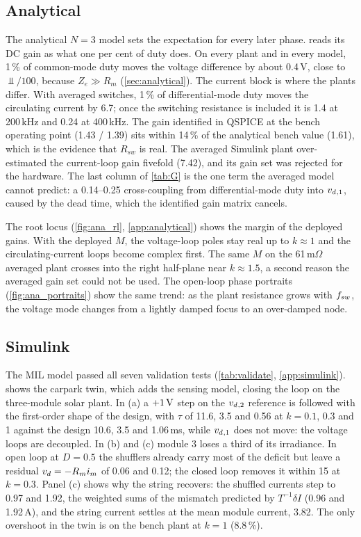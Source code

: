 \subsection{Analytical}
\label{sec:res_analytical}
The analytical $N=3$ model sets the expectation for every later phase.  reads its DC gain as what one per cent of duty does. On every plant and in every model, 1\,\% of common-mode duty moves the voltage difference by about 0.4\,V, close to $\Vbar/100$, because $Z_e \gg R_m$ (\cref{sec:analytical}). The current block is where the plants differ. With averaged switches, 1\,\% of differential-mode duty moves the circulating current by 6.7\A; once the switching resistance is included it is 1.4\A{} at 200\,kHz and 0.24\A{} at 400\,kHz. The gain identified in QSPICE at the bench operating point (1.43 / 1.39\A) sits within 14\,\% of the analytical bench value (1.61\A), which is the evidence that $R_{sw}$ is real. The averaged Simulink plant over-estimated the current-loop gain fivefold (7.42\A), and its gain set was rejected for the hardware. The last column of \cref{tab:G} is the one term the averaged model cannot predict: a 0.14--0.25\V{} cross-coupling from differential-mode duty into $v_{d}{}_{,1}$, caused by the dead time, which the identified gain matrix cancels.



The root locus (\cref{fig:ana_rl}, \cref{app:analytical}) shows the margin of the deployed gains. With the deployed $M$, the voltage-loop poles stay real up to $k \approx 1$ and the circulating-current loops become complex first. The same $M$ on the 61\,m$\Omega$ averaged plant crosses into the right half-plane near $k \approx 1.5$, a second reason the averaged gain set could not be used. The open-loop phase portraits (\cref{fig:ana_portraits}) show the same trend: as the plant resistance grows with $f_{sw}$, the voltage mode changes from a lightly damped focus to an over-damped node.

\subsection{Simulink}
\label{sec:res_simulink}
The MIL model passed all seven validation tests (\cref{tab:validate}, \cref{app:simulink}).  shows the carpark twin, which adds the sensing model, closing the loop on the three-module solar plant. In (a) a $+1\,\mathrm{V}$ step on the $v_{d}{}_{,2}$ reference is followed with the first-order shape of the design, with $\tau$ of 11.6, 3.5 and 0.56\ms{} at $k = 0.1$, 0.3 and 1 against the design 10.6, 3.5 and 1.06\,ms, while $v_{d}{}_{,1}$ does not move: the voltage loops are decoupled. In (b) and (c) module 3 loses a third of its irradiance. In open loop at $D = 0.5$ the shufflers already carry most of the deficit but leave a residual $v_{d} = -R_mi_{m}$ of 0.06 and 0.12\V; the closed loop removes it within 15\ms{} at $k = 0.3$. Panel (c) shows why the string recovers: the shuffled currents step to 0.97 and 1.92\A, the weighted sums of the mismatch predicted by $T^{-1}\delta I$ (0.96 and 1.92\,A), and the string current settles at the mean module current, 3.82\A. The only overshoot in the twin is on the bench plant at $k=1$ (8.8\,\%).

